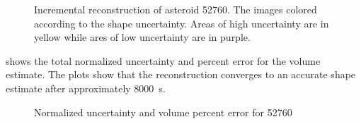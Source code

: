 \begin{figure}[htbp]
    \caption[Asteroid 52760 shape reconstruction with uncertainty]{Incremental reconstruction of asteroid 52760. The images colored according to the shape uncertainty. Areas of high uncertainty are in yellow while ares of low uncertainty are in purple.~\label{fig:52760_weights_reconstruction}}
\end{figure}
 shows the total normalized uncertainty and percent error for the volume estimate. 
The plots show that the reconstruction  converges to an accurate shape estimate after approximately \SI{8000}{\second}.

\begin{figure}[htbp]
    \centering
    
    \caption{Normalized uncertainty and volume percent error for 52760\label{fig:52760_metrics}}
\end{figure}

